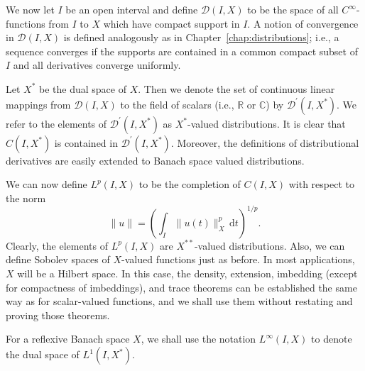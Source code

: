 We now let $I$ be an open interval and define $\mathcal{D}(I,X)$ to be the space of all $C^\infty$-functions from $I$ to $X$ which have compact support in $I$. A notion of convergence in $\mathcal{D}(I,X)$ is defined analogously as in Chapter~\ref{chap:distributions}; i.e., a sequence converges if the supports are contained in a common compact subset of $I$ and all derivatives converge uniformly.\par Let $X^*$ be the dual space of $X$. Then we denote the set of continuous linear mappings from $\mathcal{D}(I,X)$ to the field of scalars (i.e., $\mathbb{R}$ or $\mathbb{C}$) by $\mathcal{D}^{\prime}(I,X^*)$. We refer to the elements of $\mathcal{D}^{\prime}(I,X^*)$ as $X^*$-valued distributions. It is clear that $C(I,X^*)$ is contained in $\mathcal{D}^{\prime}(I,X^*)$. Moreover, the definitions of distributional derivatives are easily extended to Banach space valued distributions.

We can now define $L^p(I,X)$ to be the completion of $C(I,X)$ with respect to the norm
\begin{equation}\label{eq:banach-valued-lp-completion-norm}
\|u\|=\left(\int_I\|u(t)\|_X^p\,\mathrm{d}t\right)^{1/p}.
\end{equation}
Clearly, the elements of $L^p(I,X)$ are $X^{**}$-valued distributions. Also, we can define Sobolev spaces of $X$-valued functions just as before. In most applications, $X$ will be a Hilbert space. In this case, the density, extension, imbedding (except for compactness of imbeddings), and trace theorems can be established the same way as for scalar-valued functions, and we shall use them without restating and proving those theorems.\par For a reflexive Banach space $X$, we shall use the notation $L^\infty(I,X)$ to denote the dual space of $L^1(I,X^*)$.


